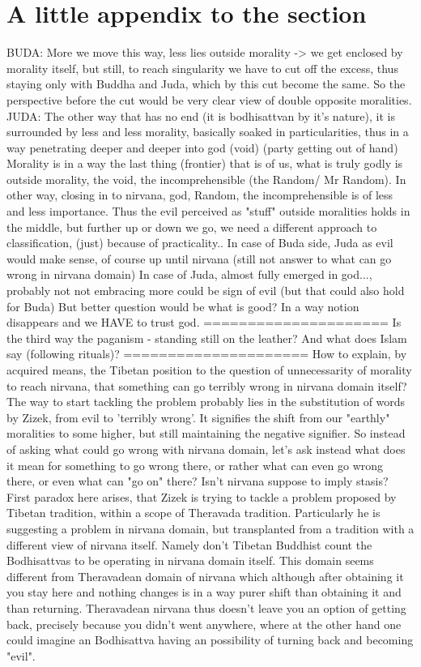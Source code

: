 \documentclass{book}
\begin{document}
\section{A little appendix to the section}
BUDA: More we move this way, less lies outside morality -> we get enclosed by morality itself, but still, to reach singularity we have to cut off the excess, thus staying only with Buddha and Juda, which by this cut become the same. So the perspective before the cut would be very clear view of double opposite moralities.
JUDA: The other way that has no end (it is bodhisattvan by it's nature), it is surrounded by less and less morality, basically soaked in particularities, thus in a way penetrating deeper and deeper into god (void) (party getting out of hand)
Morality is in a way the last thing (frontier) that is of us, what is truly godly is outside morality, the void, the incomprehensible (the Random/ Mr Random). In other way, closing in to nirvana, god, Random, the incomprehensible is of less and less importance.
Thus the evil perceived as "stuff" outside moralities holds in the middle, but further up or down we go, we need a different approach to classification, (just) because of practicality.. In case of Buda side, Juda as evil would make sense, of course up until nirvana (still not answer to what can go wrong in nirvana domain) In case of Juda, almost fully emerged in god..., probably not not embracing more could be sign of evil (but that could also hold for Buda) But better question would be what is good? In a way notion disappears and we HAVE to trust god.
=====================
Is the third way the paganism - standing still on the leather? And what does Islam say (following rituals)?
=====================
How to explain, by acquired means, the Tibetan position to the question of unnecessarity of morality to reach nirvana, that something can go terribly wrong in nirvana domain itself?
The way to start tackling the problem probably lies in the substitution of words by Zizek, from evil to 'terribly wrong'. It signifies the shift from our "earthly" moralities to some higher, but still maintaining the negative signifier. So instead of asking what could go wrong with nirvana domain, let's ask instead what does it mean for something to go wrong there, or rather what can even go wrong there, or even what can "go on" there? Isn't nirvana suppose to imply stasis?
First paradox here arises, that Zizek is trying to tackle a problem proposed by Tibetan tradition, within a scope of Theravada tradition. Particularly he is suggesting a problem in nirvana domain, but transplanted from a tradition with a different view of nirvana itself. Namely don't Tibetan Buddhist count the Bodhisattvas to be operating in nirvana domain itself. This domain seems different from Theravadean domain of nirvana which although after obtaining it you stay here and nothing changes is in a way purer shift than obtaining it and than returning. Theravadean nirvana thus doesn't leave you an option of getting back, precisely because you didn't went anywhere, where at the other hand one could imagine an Bodhisattva having an possibility of turning back and becoming "evil".
\end{document}
